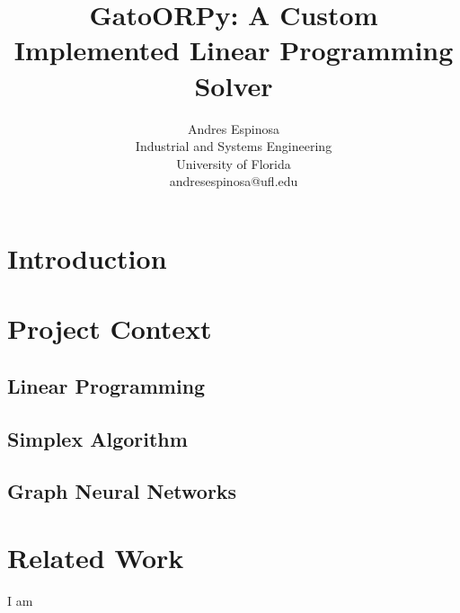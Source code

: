 \documentclass[conference]{IEEEtran}
\begin{document}
\title{GatoORPy: A Custom Implemented Linear Programming Solver}

\author{
    \begin{minipage}{0.50\textwidth}
        \centering
        \textcolor{uf_blue}{Andres Espinosa} \\
        \textcolor{uf_orange}{Industrial and Systems Engineering} \\
        \textcolor{uf_orange}{University of Florida} \\
        \textcolor{uf_orange}{andresespinosa@ufl.edu} \\ 
    \end{minipage}
}


\maketitle


\begin{abstract}

\end{abstract}

\IEEEpeerreviewmaketitle

\section{Introduction}

\section{Project Context}

\subsection{Linear Programming}
\subsection{Simplex Algorithm}
\subsection{Graph Neural Networks}

\section{Related Work}
I am \cite{gnndrl:Devailly_2022}
\end{document}
